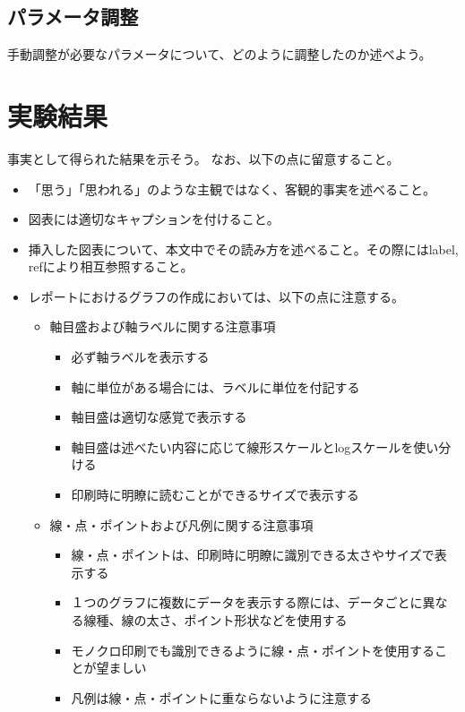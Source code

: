 \documentclass[a4paper, 11pt, titlepage]{jsarticle}
\begin{document}
\subsection{パラメータ調整}
手動調整が必要なパラメータについて、どのように調整したのか述べよう。


\section{実験結果}
事実として得られた結果を示そう。
なお、以下の点に留意すること。

\begin{itemize}
 \item 「思う」「思われる」のような主観ではなく、客観的事実を述べること。
 \item 図表には適切なキャプションを付けること。
 \item 挿入した図表について、本文中でその読み方を述べること。その際にはlabel, refにより相互参照すること。
 \item レポートにおけるグラフの作成においては、以下の点に注意する。
 \begin{itemize}
 	\item 軸目盛および軸ラベルに関する注意事項
 	\begin{itemize}
 		\item 必ず軸ラベルを表示する
 		\item 軸に単位がある場合には、ラベルに単位を付記する
 		\item 軸目盛は適切な感覚で表示する
 		\item 軸目盛は述べたい内容に応じて線形スケールとlogスケールを使い分ける
 		\item 印刷時に明瞭に読むことができるサイズで表示する
 	\end{itemize}
 	\item 線・点・ポイントおよび凡例に関する注意事項
 	\begin{itemize}
 		\item 線・点・ポイントは、印刷時に明瞭に識別できる太さやサイズで表示する
 		\item １つのグラフに複数にデータを表示する際には、データごとに異なる線種、線の太さ、ポイント形状などを使用する
 		\item モノクロ印刷でも識別できるように線・点・ポイントを使用することが望ましい
 		\item 凡例は線・点・ポイントに重ならないように注意する
 	\end{itemize}
 \end{itemize}
\end{itemize}
\end{document}
